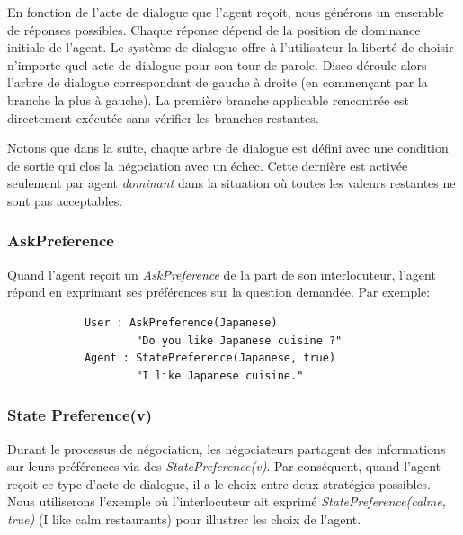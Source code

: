	En fonction de l'acte de dialogue que l'agent reçoit, nous générons un ensemble de réponses possibles. Chaque réponse dépend de la position de dominance initiale de l'agent. Le système de dialogue offre à l'utilisateur la liberté de choisir n'importe quel acte de dialogue pour son tour de parole. Disco déroule alors l'arbre de dialogue correspondant de gauche à droite (en commençant par la branche la plus à gauche). La première branche applicable rencontrée est directement exécutée sans vérifier les branches restantes.
	
	Notons que dans la suite, chaque arbre de dialogue est défini avec une condition de sortie qui clos la négociation avec un échec. Cette dernière est activée seulement par agent \emph{dominant} dans la situation où toutes les valeurs restantes ne sont pas acceptables. 
	
	\subsubsection{AskPreference}
		Quand l'agent reçoit un \emph{AskPreference} de la part de son interlocuteur, l'agent répond en exprimant ses préférences sur la question demandée. Par exemple: 
		
		\begin{verbatim}
			User : AskPreference(Japanese) 
					"Do you like Japanese cuisine ?"
			Agent : StatePreference(Japanese, true)
					"I like Japanese cuisine."
		\end{verbatim}
	

		 
		 
	\subsubsection{State Preference(v)}
		Durant le processus de négociation, les négociateurs partagent des informations sur leurs préférences via des \emph{StatePreference(v)}. Par conséquent, quand l'agent reçoit ce type d'acte de dialogue, il a le choix entre deux stratégies possibles. Nous utiliserons l'exemple où l'interlocuteur ait exprimé  \emph{StatePreference(calme, true)} (I like calm restaurants) pour illustrer les choix de l'agent. 
		
		
